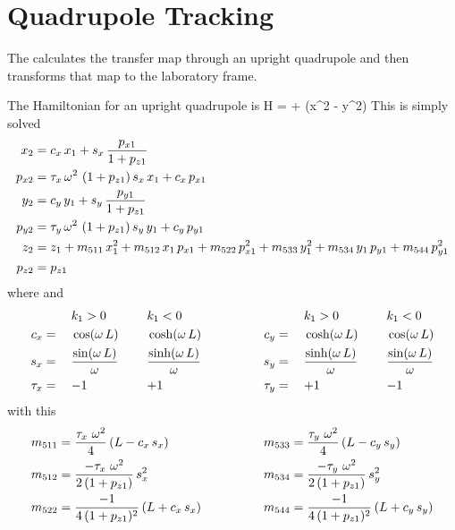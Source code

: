 \section{Quadrupole Tracking}
\label{s:quadrupole.std}

The  calculates the transfer map through an upright
quadrupole and then transforms that map to the laboratory frame.

The Hamiltonian for an upright quadrupole is
\Begineq
  H =  +  (x^2 - y^2)
\Endeq
This is simply solved
\begin{align}
  x_2    &= c_x \, x_1 + s_x \, \frac{p_{x1}}{1 + p_{z1}} \nonumber \\
  p_{x2} &= \tau_x \, \omega^2 \, \, (1 + p_{z1}) \, s_x \, x_1 + c_x \, p_{x1} \nonumber \\
  y_2    &= c_y \, y_1 + s_y \, \frac{p_{y1}}{1 + p_{z1}} \nonumber \\
  p_{y2} &= \tau_y \, \omega^2 \, \, (1 + p_{z1}) \, s_y \, y_1 + c_y \, p_{y1} \\
  z_2    &= z_1 + m_{511} \, x_1^2 + m_{512} \, x_1 \, p_{x1} + m_{522} \, p_{x1}^2 + 
                   m_{533} \, y_1^2 + m_{534} \, y_1 \, p_{y1} + m_{544} \, p_{y1}^2 \nonumber \\
  p_{z2} &= p_{z1} \nonumber
\end{align}
where 
\Begineq
  \om \equiv {}
\Endeq
and
\begin{alignat}{6}
         &\hspace*{3ex}  && k_1 > 0          &\hspace*{3ex}& k_1 < 0 & \qquad \qquad
         &\hspace*{3ex}  && k_1 > 0          &\hspace*{3ex}& k_1 < 0 \nonumber \\
     c_x &=   && \cos  (\omega \, L) && \cosh (\omega \, L) & \qquad \qquad
     c_y &=   && \cosh (\omega \, L) && \cos  (\omega \, L) \nonumber \\
     s_x &=   && \frac{\sin  (\omega \, L)}{\omega} && \frac{\sinh (\omega \, L)}{\omega} & \qquad \qquad
     s_y &=   && \frac{\sinh (\omega \, L)}{\omega} && \frac{\sin  (\omega \, L)}{\omega} \\
  \tau_x &=   && {-}1             && {+}1             & \qquad \qquad
  \tau_y &=   && {+}1             && {-}1             \nonumber
\end{alignat}
with this
\begin{alignat}{2}
  m_{511} &= \frac{\tau_x \,\, \omega^2}{4} \, (L - c_x \, s_x) & \qquad \qquad
  m_{533} &= \frac{\tau_y \,\, \omega^2}{4} \, (L - c_y \, s_y) \nonumber \\
  m_{512} &= \frac{-\tau_x \,\, \omega^2}{2 \, (1 + p_{z1})} \, s_x^2 & \qquad \qquad
  m_{534} &= \frac{-\tau_y \,\, \omega^2}{2 \, (1 + p_{z1})} \, s_y^2 \\
  m_{522} &= \frac{-1}{4 \, (1 + p_{z1})^2} \, (L + c_x \, s_x) & \qquad \qquad
  m_{544} &= \frac{-1}{4 \, (1 + p_{z1})^2} \, (L + c_y \, s_y) \nonumber
\end{alignat}

